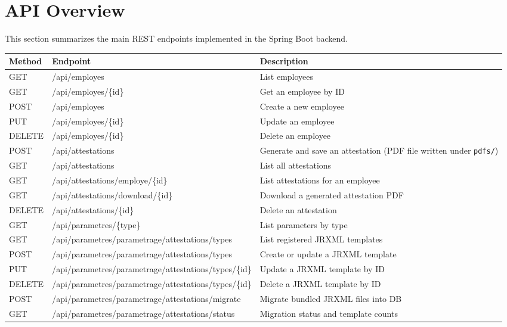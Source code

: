\documentclass[a4paper,12pt]{report}
\begin{document}
\section{API Overview}
\begin{doublespace}
This section summarizes the main REST endpoints implemented in the Spring Boot backend.

\begin{center}
\begin{tabular}{|l|l|p{9cm}|}
\hline
\textbf{Method} & \textbf{Endpoint} & \textbf{Description} \\
\hline
GET & /api/employes & List employees \\
\hline
GET & /api/employes/\{id\} & Get an employee by ID \\
\hline
POST & /api/employes & Create a new employee \\
\hline
PUT & /api/employes/\{id\} & Update an employee \\
\hline
DELETE & /api/employes/\{id\} & Delete an employee \\
\hline
POST & /api/attestations & Generate and save an attestation (PDF file written under \texttt{pdfs/}) \\
\hline
GET & /api/attestations & List all attestations \\
\hline
GET & /api/attestations/employe/\{id\} & List attestations for an employee \\
\hline
GET & /api/attestations/download/\{id\} & Download a generated attestation PDF \\
\hline
DELETE & /api/attestations/\{id\} & Delete an attestation \\
\hline
GET & /api/parametres/\{type\} & List parameters by type \\
\hline
GET & /api/parametres/parametrage/attestations/types & List registered JRXML templates \\
\hline
POST & /api/parametres/parametrage/attestations/types & Create or update a JRXML template \\
\hline
PUT & /api/parametres/parametrage/attestations/types/\{id\} & Update a JRXML template by ID \\
\hline
DELETE & /api/parametres/parametrage/attestations/types/\{id\} & Delete a JRXML template by ID \\
\hline
POST & /api/parametres/parametrage/attestations/migrate & Migrate bundled JRXML files into DB \\
\hline
GET & /api/parametres/parametrage/attestations/status & Migration status and template counts \\

\end{tabular}
\end{center}
\end{doublespace}
\end{document}
